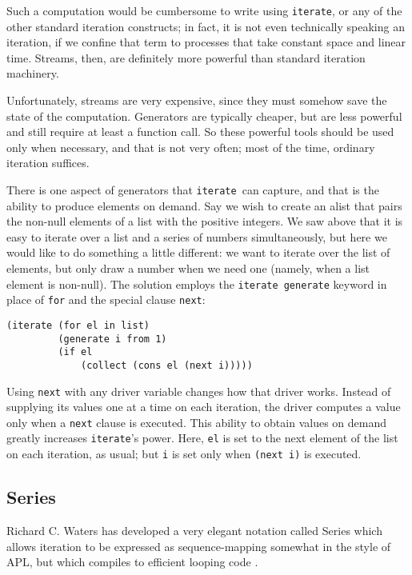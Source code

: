 \documentclass[12pt]{article}
\newcommand{\lisp}{\tt}
\newcommand{\iter}{{\lisp iterate}}
\begin{document}
Such a computation would be cumbersome to write using \iter, or any of
the other standard iteration constructs; in fact, it is not even
technically speaking an iteration, if we confine that term to
processes that take constant space and linear time.  Streams, then,
are definitely more powerful than standard iteration machinery.

Unfortunately, streams are very expensive, since they must somehow
save the state of the computation.  Generators are typically cheaper,
but are less powerful and still require at least a function call.  
So these powerful tools should be used only when necessary, and that
is not very often; most of the time, ordinary iteration suffices.

There is one aspect of generators that \iter\ can capture, and that is
the ability to produce elements on demand.  Say we wish to
create an alist that pairs the non-null elements of a list with the
positive integers.  We saw above that it is easy to iterate over
a list and a series of numbers simultaneously, but here we would like
to do something a little different: we want to iterate over the list
of elements, but only draw a number when we need one (namely, when a list
element is non-null). The solution employs the \iter\ {\lisp generate}
keyword in place of {\lisp for} and the special clause
{\lisp next}: 

{\samepage
\begin{verbatim}
(iterate (for el in list)
         (generate i from 1)
         (if el
             (collect (cons el (next i)))))
\end{verbatim}
}

Using {\lisp next} with any driver variable changes how that driver
works.  Instead of supplying its values one at a time on each iteration,
the driver computes a value only when a {\lisp next} clause is
executed.  This ability to obtain values on demand greatly increases
\iter's power.  Here, {\lisp el} is set to the next element of the
list on each iteration, as usual; but {\lisp i} is set only when 
{\lisp (next i)} is executed.

\subsection{Series}

Richard C. Waters has developed a very elegant notation called Series
which allows iteration to be expressed as sequence-mapping somewhat in
the style of APL, but which compiles to efficient looping code
\cite{Series}.
\end{document}
